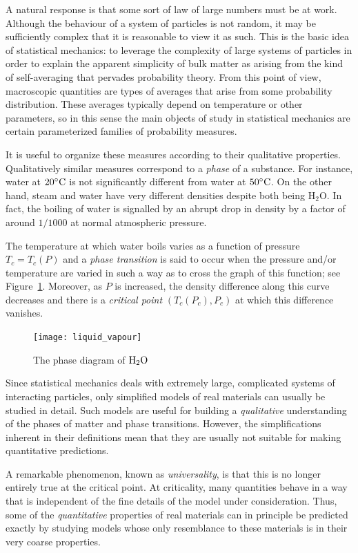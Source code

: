A natural response is that some sort of law of large numbers
must be at work. Although the behaviour of a system of particles is not random, it may
be sufficiently complex that it is reasonable to view it as such.
This is the basic idea of statistical mechanics: to leverage the complexity of
large systems of particles in order to explain the apparent simplicity of bulk
matter as arising from the kind of self-averaging that pervades probability
theory. From this point of view, macroscopic quantities are types of averages that
arise from some probability distribution. These averages typically depend on
temperature or other parameters, so in this sense the main objects of study in
statistical mechanics are certain parameterized families of probability measures.

It is useful to organize these measures according to their qualitative properties.
Qualitatively similar measures correspond to a \emph{phase} of a substance. For
instance, water at $20^\circ{\rm C}$ is not significantly different from water at
$50^\circ{\rm C}$. On the other hand, steam and water have very different densities
despite both being $\mathrm{H_2O}$. In fact, the boiling of water is signalled by an
abrupt drop in density by a factor of around $1/1000$ at normal atmospheric pressure.

The temperature at which water
boils varies as a function of pressure $T_c = T_c(P)$ and a \emph{phase transition}
is said to occur when the pressure and/or temperature are varied in such a way as to
cross the graph of this function; see Figure~\ref{fig:liquid-vapour}.
Moreover, as $P$ is increased, the density difference along this curve decreases and
there is a \emph{critical point} $(T_c(P_c), P_c)$ at which this difference vanishes.

\begin{figure}
\centering
\label{fig:liquid-vapour}
\texttt{[image: liquid\_vapour]}
\caption[Phase diagram of $\rm H_2 O$]{The phase diagram of $\rm H_2 O$}
\end{figure}

Since statistical mechanics deals with extremely large, complicated systems of
interacting particles, only simplified models of real materials can usually be
studied in detail. Such models are useful for building a
\emph{qualitative} understanding of the phases of matter and phase transitions.
However, the simplifications inherent in their definitions mean that they are
usually not suitable for making quantitative predictions.

A remarkable phenomenon, known as \emph{universality}, is that this is no longer
entirely true at the critical point. At criticality, many quantities behave in a
way that is independent of the fine details of the model under consideration. Thus,
some of the \emph{quantitative} properties of real materials can in principle be
predicted exactly by studying models whose only resemblance to these materials is
in their very coarse properties.

